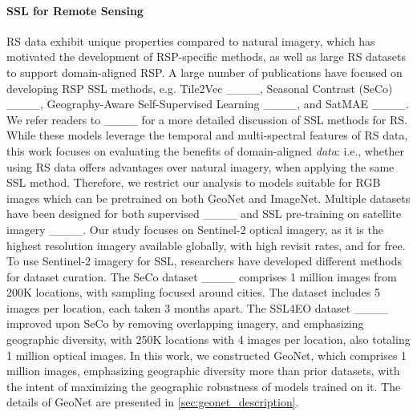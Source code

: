 \paragraph{SSL for Remote Sensing}
RS data exhibit unique properties compared to natural imagery, which has motivated the development of RSP-specific methods, as well as large RS datasets to support domain-aligned RSP. A large number of publications have focused on developing RSP SSL methods, e.g. Tile2Vec ____, Seasonal Contrast (SeCo) ____, Geography-Aware Self-Supervised Learning ____, and SatMAE ____.  We refer readers to ____ for a more detailed discussion of SSL methods for RS. While these models leverage the temporal and multi-spectral features of RS data, this work focuses on evaluating the benefits of domain-aligned \textit{data}: i.e., whether using RS data offers advantages over natural imagery, when applying the same SSL method. Therefore, we restrict our analysis to models suitable for RGB images which can be pretrained on both GeoNet and ImageNet.  Multiple datasets have been designed for both supervised ____ and SSL pre-training on satellite imagery ____.  Our study focuses on Sentinel-2 optical imagery, as it is the highest resolution imagery available globally, with high revisit rates, and for free. To use Sentinel-2 imagery for SSL, researchers have developed different methods for dataset curation. The SeCo dataset ____ comprises 1 million images from 200K locations, with sampling focused around cities. The dataset includes 5 images per location, each taken 3 months apart. The SSL4EO dataset ____ improved upon SeCo by removing overlapping imagery, and emphasizing geographic diversity, with 250K locations with 4 images per location, also totaling 1 million optical images.  In this work, we constructed GeoNet, which comprises 1 million images, emphasizing geographic diversity more than prior datasets, with the intent of maximizing the geographic robustness of models trained on it. The details of GeoNet are presented in \cref{sec:geonet_description}.   


